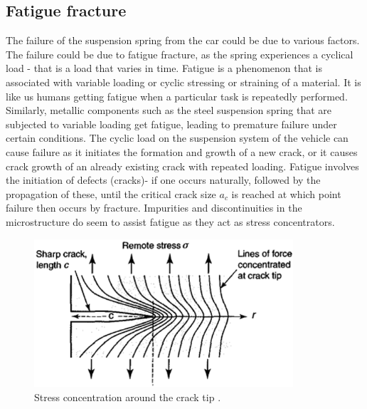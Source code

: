 \documentclass[11pt]{article}
\begin{document}
\subsection{Fatigue fracture}
The failure of the suspension spring from the car could be due to various factors. The failure could be due to fatigue fracture, as the spring experiences a cyclical load - that is a load that varies in time. Fatigue is a phenomenon that is associated with variable loading or cyclic stressing or straining of a material. It is like us humans getting fatigue when a particular task is repeatedly performed. Similarly, metallic components such as the steel suspension spring that are subjected to variable loading get fatigue, leading to premature failure under certain conditions. The cyclic load on the suspension system of the vehicle can cause failure as it initiates the formation and growth of a new crack, or it causes crack growth of an already existing crack with repeated loading. Fatigue involves the initiation of defects (cracks)- if one occurs naturally, followed by the propagation of these, until the critical crack size $a_c$ is reached at which point failure then occurs by fracture. Impurities and discontinuities in the microstructure do seem to assist fatigue as they act as stress concentrators. 
 \begin{figure}[H]
    \centering
    \includegraphics[height = 5.5cm]{./img/stress1.png}
    \caption{Stress concentration around the crack tip \cite{b13}.}
    \label{fig:stress1}
\end{figure}
\end{document}
